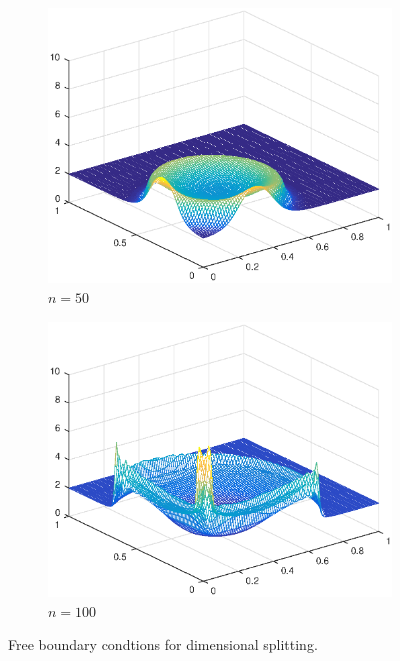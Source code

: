 \begin{figure}[h!]
    \begin{subfigure}[t]{0.48\textwidth}
        \centering
        \includegraphics[width=\textwidth]{images/sol_ds_005_per.eps}
        \caption{$n=50$}
        \label{fig:50}
    \end{subfigure}
    \begin{subfigure}[t]{0.48\textwidth}
        \centering
        \includegraphics[width=\textwidth]{images/sol_ds_0100_per.eps}
        \caption{$n=100$}
        \label{fig:100}
    \end{subfigure}
    \caption{Free boundary condtions for dimensional splitting.}
    \label{fig:2DSolutions_ds}
\end{figure}


